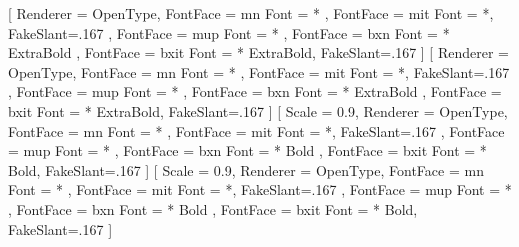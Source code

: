 \usepackage{geometry}

\usepackage{diagbox}                        %
\usepackage[utf8]{inputenc}
\usepackage{setspace}
\usepackage{tocloft}
\usepackage{makeidx}
\usepackage{parskip}
\usepackage[hangul]{kotex}
\usepackage[T1]{fontenc} 
\usepackage{listings}                       %

\usepackage[framemethod=tikz]{mdframed}
\usepackage[unicode]{hyperref}
\usepackage[many]{tcolorbox}
\usepackage{makecell}
\usepackage{environ}
\usepackage[tikz]{bclogo}
\usepackage{tikz}
\usepackage{natbib}
\usepackage{lastpage}
\usepackage{graphicx}
\usepackage{awesomebox}                     %


\setmainfont{Times New Roman}
[%
	Renderer = OpenType,
	FontFace = {m}{n}{ Font = * },
	FontFace = {m}{it}{ Font = *, FakeSlant=.167 },
	FontFace = {m}{up}{ Font = * },
	FontFace = {bx}{n}{ Font = {* ExtraBold} },
	FontFace = {bx}{it}{ Font = {* ExtraBold}, FakeSlant=.167 }
]
[%
	Renderer = OpenType,
	FontFace = {m}{n}{ Font = * },
	FontFace = {m}{it}{ Font = *, FakeSlant=.167 },
	FontFace = {m}{up}{ Font = * },
	FontFace = {bx}{n}{ Font = {* ExtraBold} },
	FontFace = {bx}{it}{ Font = {* ExtraBold}, FakeSlant=.167 }
]
\setmonofont{NanumGothicCoding}[%
  Scale = 0.9,
  Renderer = OpenType,
	FontFace = {m}{n}{ Font = * },
	FontFace = {m}{it}{ Font = *, FakeSlant=.167 },
	FontFace = {m}{up}{ Font = * },
	FontFace = {bx}{n}{ Font = {* Bold} },
	FontFace = {bx}{it}{ Font = {* Bold}, FakeSlant=.167 }
]
[%
  Scale = 0.9,
  Renderer = OpenType,
	FontFace = {m}{n}{ Font = * },
	FontFace = {m}{it}{ Font = *, FakeSlant=.167 },
	FontFace = {m}{up}{ Font = * },
	FontFace = {bx}{n}{ Font = {* Bold} },
	FontFace = {bx}{it}{ Font = {* Bold}, FakeSlant=.167 }
]

